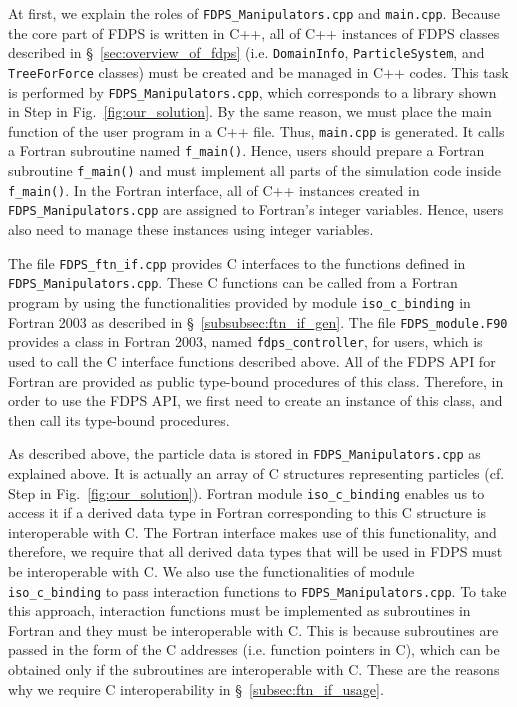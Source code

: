 \documentclass[proof,useamsfonts]{pasj01}
\begin{document}
At first, we explain the roles of \texttt{FDPS\_Manipulators.cpp} and \texttt{main.cpp}. Because the core part of FDPS is written in C++, all of C++ instances of FDPS classes described in \S~\ref{sec:overview_of_fdps} (i.e. \texttt{DomainInfo}, \texttt{ParticleSystem}, and \texttt{TreeForForce} classes) must be created and be managed in C++ codes. This task is performed by \texttt{FDPS\_Manipulators.cpp}, which corresponds to a library shown in Step {\large {}\hbox{}} in Fig.~\ref{fig:our_solution}. By the same reason, we must place the main function of the user program in a C++ file. Thus, \texttt{main.cpp} is generated. It calls a Fortran subroutine named \texttt{f\_main()}. Hence, users should prepare a Fortran subroutine \texttt{f\_main()} and must implement all parts of the simulation code inside \texttt{f\_main()}. In the Fortran interface, all of C++ instances created in \texttt{FDPS\_Manipulators.cpp} are assigned to Fortran’s integer variables. Hence, users also need to manage these instances using integer variables.

The file \texttt{FDPS\_ftn\_if.cpp} provides C interfaces to the functions defined in \texttt{FDPS\_Manipulators.cpp}. These C functions can be called from a Fortran program by using the functionalities provided by module \texttt{iso\_c\_binding} in Fortran 2003 as described in \S~\ref{subsubsec:ftn_if_gen}. The file \texttt{FDPS\_module.F90} provides a class in Fortran 2003, named \texttt{fdps\_controller}, for users, which is used to call the C interface functions described above. All of the FDPS API for Fortran are provided as public type-bound procedures of this class. Therefore, in order to use the FDPS API, we first need to create an instance of this class, and then call its type-bound procedures.

As described above, the particle data is stored in \texttt{FDPS\_Manipulators.cpp} as explained above. It is actually an array of C structures representing particles (cf. Step {\large {}\hbox{}} in Fig.~\ref{fig:our_solution}). Fortran module \texttt{iso\_c\_binding} enables us to access it if a derived data type in Fortran corresponding to this C structure is interoperable with C. The Fortran interface makes use of this functionality, and therefore, we require that all derived data types that will be used in FDPS must be interoperable with C. We also use the functionalities of module \texttt{iso\_c\_binding} to pass interaction functions to \texttt{FDPS\_Manipulators.cpp}. To take this approach, interaction functions must be implemented as subroutines in Fortran and they must be interoperable with C. This is because subroutines are passed in the form of the C addresses  (i.e. function pointers in C), which can be obtained only if the subroutines are interoperable with C. These are the reasons why we require C interoperability in \S~\ref{subsec:ftn_if_usage}.
\end{document}
